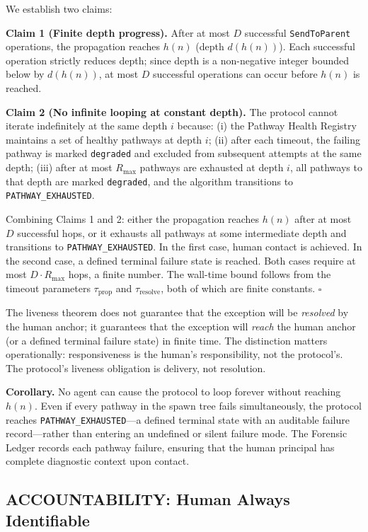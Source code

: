 We establish two claims:

\textbf{Claim 1 (Finite depth progress).} After at most $D$ successful \texttt{SendToParent} operations, the propagation reaches $h(n)$ (depth $d(h(n))$). Each successful operation strictly reduces depth; since depth is a non-negative integer bounded below by $d(h(n))$, at most $D$ successful operations can occur before $h(n)$ is reached.

\textbf{Claim 2 (No infinite looping at constant depth).} The protocol cannot iterate indefinitely at the same depth $i$ because: (i) the Pathway Health Registry maintains a set of healthy pathways at depth $i$; (ii) after each timeout, the failing pathway is marked \texttt{degraded} and excluded from subsequent attempts at the same depth; (iii) after at most $R_{\max}$ pathways are exhausted at depth $i$, all pathways to that depth are marked \texttt{degraded}, and the algorithm transitions to \texttt{PATHWAY\_EXHAUSTED}.

Combining Claims 1 and 2: either the propagation reaches $h(n)$ after at most $D$ successful hops, or it exhausts all pathways at some intermediate depth and transitions to \texttt{PATHWAY\_EXHAUSTED}. In the first case, human contact is achieved. In the second case, a defined terminal failure state is reached. Both cases require at most $D \cdot R_{\max}$ hops, a finite number. The wall-time bound follows from the timeout parameters $\tau_{\text{prop}}$ and $\tau_{\text{resolve}}$, both of which are finite constants. $\square$

The liveness theorem does not guarantee that the exception will be \emph{resolved} by the human anchor; it guarantees that the exception will \emph{reach} the human anchor (or a defined terminal failure state) in finite time. The distinction matters operationally: responsiveness is the human's responsibility, not the protocol's. The protocol's liveness obligation is delivery, not resolution.

\textbf{Corollary.} No agent can cause the protocol to loop forever without reaching $h(n)$. Even if every pathway in the spawn tree fails simultaneously, the protocol reaches \texttt{PATHWAY\_EXHAUSTED}---a defined terminal state with an auditable failure record---rather than entering an undefined or silent failure mode. The Forensic Ledger records each pathway failure, ensuring that the human principal has complete diagnostic context upon contact.

\subsection{ACCOUNTABILITY: Human Always Identifiable}
\label{sec:accountability}

